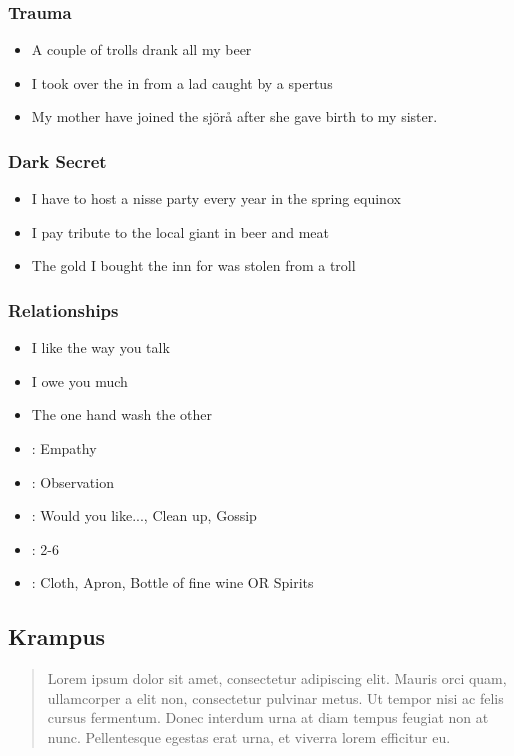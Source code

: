 \documentclass[english]{vaesen-supplement}
\begin{document}
\subsubsection{Trauma}
\begin{itemize}
    \item A couple of trolls drank all my beer
    \item I took over the in from a lad caught by a spertus
    \item My mother have joined the sjörå after she gave birth to my sister. 
\end{itemize}
\subsubsection{Dark Secret}
\begin{itemize}
    \item I have to host a nisse party every year in the spring equinox
    \item I pay tribute to the local giant in beer and meat
    \item The gold I bought the inn for was stolen from a troll
\end{itemize}
\subsubsection{Relationships}
\begin{itemize}
    \item I like the way you talk
    \item I owe you much
    \item The one hand wash the other
\end{itemize}
\begin{panel}[empty]{}
\begin{itemize}
    \item {}: Empathy
    \item {}: Observation
    \item {}: Would you like..., Clean up, Gossip
    \item {}: 2-6
    \item {}: Cloth, Apron, Bottle of fine wine OR Spirits
\end{itemize}
\end{panel}

\newpage

\begin{strip}
\section[Example Vaesen]{\HUGE Krampus}

\begin{quote}\handwritten Lorem ipsum dolor sit amet, consectetur adipiscing elit. Mauris orci quam, ullamcorper a elit non, consectetur pulvinar metus. Ut tempor nisi ac felis cursus fermentum. Donec interdum urna at diam tempus feugiat non at nunc. Pellentesque egestas erat urna, et viverra lorem efficitur eu.\end{quote}
\end{strip}
\end{document}
